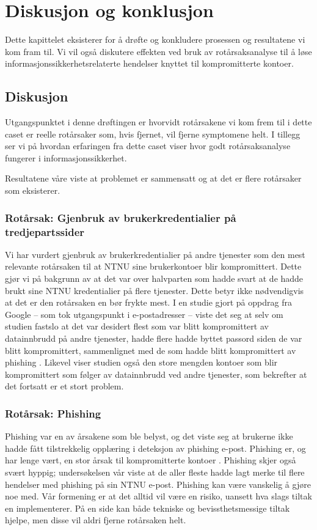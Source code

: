 \chapter{Diskusjon og konklusjon}
Dette kapittelet eksisterer for å drøfte og konkludere prosessen og resultatene vi kom fram til. Vi vil også diskutere effekten ved bruk av rotårsaksanalyse til å løse informasjonssikkerhetsrelaterte hendelser knyttet til kompromitterte kontoer. 

\section{Diskusjon}
Utgangspunktet i denne drøftingen er hvorvidt rotårsakene vi kom frem til i dette caset er reelle rotårsaker som, hvis fjernet, vil fjerne symptomene helt. I tillegg ser vi på hvordan erfaringen fra dette caset viser hvor godt rotårsaksanalyse fungerer i informasjonssikkerhet. 

Resultatene våre viste at problemet er sammensatt og at det er flere rotårsaker som eksisterer. 

\subsection{Rotårsak: Gjenbruk av brukerkredentialier på tredjepartssider}
Vi har vurdert gjenbruk av brukerkredentialier på andre tjenester som den mest relevante rotårsaken til at NTNU sine brukerkontoer blir kompromittert. Dette gjør vi på bakgrunn av at det var over halvparten som hadde svart at de hadde brukt sine NTNU kredentialier på flere tjenester. Dette betyr ikke nødvendigvis at det er den rotårsaken en bør frykte mest. I en studie gjort på oppdrag fra Google – som tok utgangspunkt i e-postadresser – viste det seg at selv om studien fastslo at det var desidert flest som var blitt kompromittert av datainnbrudd på andre tjenester, hadde flere hadde byttet passord siden de var blitt kompromittert, sammenlignet med de som hadde blitt kompromittert av phishing \cite{46437}. Likevel viser studien også den store mengden kontoer som blir kompromittert som følger av datainnbrudd ved andre tjenester, som bekrefter at det fortsatt er et stort problem. 

\subsection{Rotårsak: Phishing}
Phishing var en av årsakene som ble belyst, og det viste seg at brukerne ikke hadde fått tilstrekkelig opplæring i deteksjon av phishing e-post. Phishing er, og har lenge vært, en stor årsak til kompromitterte kontoer \cite{SophPhish}. Phishing skjer også svært hyppig; undersøkelsen vår viste at de aller fleste hadde lagt merke til flere hendelser med phishing på sin NTNU e-post. Phishing kan være vanskelig å gjøre noe med. Vår formening er at det alltid vil være en risiko, uansett hva slags tiltak en implementerer. På en side kan både tekniske og bevissthetsmessige tiltak hjelpe, men disse vil aldri fjerne rotårsaken helt. 


